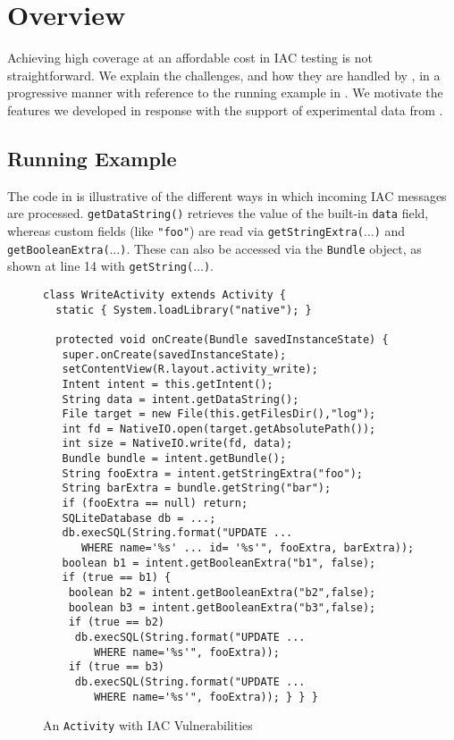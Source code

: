 \section{Overview}

Achieving high coverage at an affordable cost in IAC testing is not straightforward. We explain the challenges, and how they are handled by \Tool, in a progressive manner with reference to the running example in . We motivate the features we developed in response with the support of experimental data from .

\subsection{Running Example}

The code in  is illustrative of the different ways in which incoming IAC messages are processed. {\tt getDataString()} retrieves the value of the built-in {\tt data} field, whereas custom fields (like {\tt "foo"}) are read via {\tt getStringExtra($\ldots$)} and {\tt getBooleanExtra($\ldots$)}. These can also be accessed via the {\tt Bundle} object, as shown at line 14 with {\tt getString($\ldots$)}.

\begin{figure}
	\begin{scriptsize}
	\begin{lstlisting}[showstringspaces=false,xleftmargin=0.33cm]
class WriteActivity extends Activity {
  static { System.loadLibrary("native"); }

  protected void onCreate(Bundle savedInstanceState) {
   super.onCreate(savedInstanceState);
   setContentView(R.layout.activity_write);
   Intent intent = this.getIntent();
   String data = intent.getDataString();	
   File target = new File(this.getFilesDir(),"log");
   int fd = NativeIO.open(target.getAbsolutePath());	
   int size = NativeIO.write(fd, data);		 
   Bundle bundle = intent.getBundle();
   String fooExtra = intent.getStringExtra("foo");
   String barExtra = bundle.getString("bar");		
   if (fooExtra == null) return;	
   SQLiteDatabase db = ...;
   db.execSQL(String.format("UPDATE ... 
      WHERE name='%s' ... id= '%s'", fooExtra, barExtra));	
   boolean b1 = intent.getBooleanExtra("b1", false);
   if (true == b1) {
    boolean b2 = intent.getBooleanExtra("b2",false);
    boolean b3 = intent.getBooleanExtra("b3",false);
    if (true == b2)
     db.execSQL(String.format("UPDATE ... 
        WHERE name='%s'", fooExtra));
    if (true == b3)
     db.execSQL(String.format("UPDATE ... 
        WHERE name='%s'", fooExtra)); } } }
	\end{lstlisting}
		\end{scriptsize}
	\caption{\label{Fi:techExample}An \texttt{Activity} with IAC Vulnerabilities}
\end{figure}

